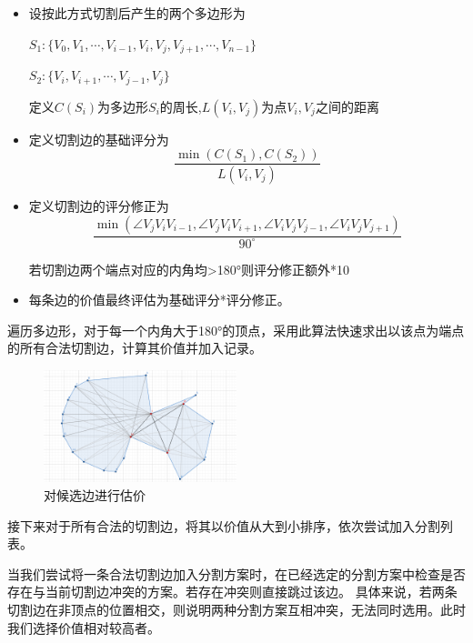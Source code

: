 \begin{itemize}
    \item 设按此方式切割后产生的两个多边形为

    \(S_1:\{ V_0,V_1,\cdots,V_{i-1},V_i,V_j,V_{j+1},\cdots,V_{n-1}\} \)

    \(S_2:\{ V_i,V_{i+1},\cdots,V_{j-1},V_j\}\)

    定义\(C(S_i)\)为多边形\(S_i\)的周长,\quad \(L(V_i,V_j)\)为点\(V_i,V_j\)之间的距离

    \item 定义切割边的基础评分为
    \begin{equation}
        \frac {\min(C(S_1),C(S_2))}{L(V_i,V_j)}
    \end{equation}
    \item 定义切割边的评分修正为
    \begin{equation}
        \frac {\min(\angle V_jV_iV_{i-1},\angle V_jV_iV_{i+1},\angle V_iV_jV_{j-1},\angle V_iV_jV_{j+1})}{90^\circ}
    \end{equation}

    若切割边两个端点对应的内角均>180°则评分修正额外*10

    \item 每条边的价值最终评估为基础评分*评分修正。
    
\end{itemize}

遍历多边形，对于每一个内角大于180°的顶点，采用此算法快速求出以该点为端点的所有合法切割边，计算其价值并加入记录。

\begin{figure}[htp]
    \centering
    \includegraphics[width=0.5\textwidth]
    {figures/pass1.png}
    \caption{对候选边进行估价}
    \label{pass1}
\end{figure}

接下来对于所有合法的切割边，将其以价值从大到小排序，依次尝试加入分割列表。

当我们尝试将一条合法切割边加入分割方案时，在已经选定的分割方案中检查是否存在与当前切割边冲突的方案。若存在冲突则直接跳过该边。
具体来说，若两条切割边在非顶点的位置相交，则说明两种分割方案互相冲突，无法同时选用。此时我们选择价值相对较高者。

